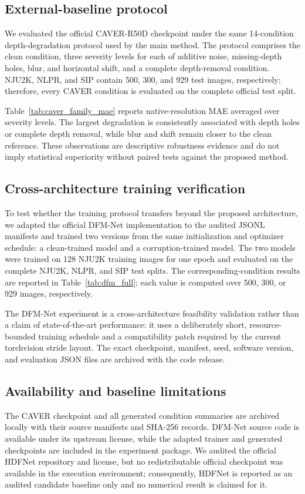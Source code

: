 \subsection{External-baseline protocol}
We evaluated the official CAVER-R50D checkpoint under the same 14-condition depth-degradation protocol used by the main method. The protocol comprises the clean condition, three severity levels for each of additive noise, missing-depth holes, blur, and horizontal shift, and a complete depth-removal condition. NJU2K, NLPR, and SIP contain 500, 300, and 929 test images, respectively; therefore, every CAVER condition is evaluated on the complete official test split.

Table~\ref{tab:caver_family_mae} reports native-resolution MAE averaged over severity levels. The largest degradation is consistently associated with depth holes or complete depth removal, while blur and shift remain closer to the clean reference. These observations are descriptive robustness evidence and do not imply statistical superiority without paired tests against the proposed method.

\subsection{Cross-architecture training verification}
To test whether the training protocol transfers beyond the proposed architecture, we adapted the official DFM-Net implementation to the audited JSONL manifests and trained two versions from the same initialization and optimizer schedule: a clean-trained model and a corruption-trained model. The two models were trained on 128 NJU2K training images for one epoch and evaluated on the complete NJU2K, NLPR, and SIP test splits. The corresponding-condition results are reported in Table~\ref{tab:dfm_full}; each value is computed over 500, 300, or 929 images, respectively.

The DFM-Net experiment is a cross-architecture feasibility validation rather than a claim of state-of-the-art performance: it uses a deliberately short, resource-bounded training schedule and a compatibility patch required by the current torchvision stride layout. The exact checkpoint, manifest, seed, software version, and evaluation JSON files are archived with the code release.

\subsection{Availability and baseline limitations}
The CAVER checkpoint and all generated condition summaries are archived locally with their source manifests and SHA-256 records. DFM-Net source code is available under its upstream license, while the adapted trainer and generated checkpoints are included in the experiment package. We audited the official HDFNet repository and license, but no redistributable official checkpoint was available in the execution environment; consequently, HDFNet is reported as an audited candidate baseline only and no numerical result is claimed for it.
